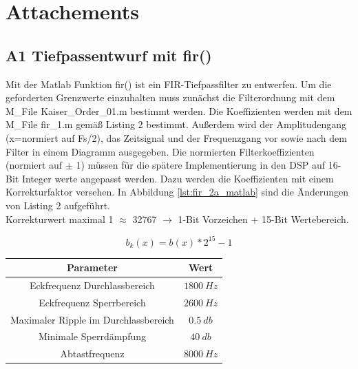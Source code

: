 \section{Attachements}

\subsection{A1 Tiefpassentwurf mit fir()}
Mit der Matlab Funktion fir() ist ein FIR-Tiefpassfilter zu entwerfen. Um die geforderten Grenzwerte einzuhalten muss zunächst die Filterordnung mit dem M\_File Kaiser\_Order\_01.m bestimmt werden. Die Koeffizienten werden mit dem M\_File fir\_1.m gemäß Listing 2 bestimmt. Außerdem wird der Amplitudengang (x=normiert auf Fs/2), das Zeitsignal und der Frequenzgang vor sowie nach dem Filter in einem Diagramm ausgegeben. Die normierten Filterkoeffizienten (normiert auf $\pm$ 1) müssen für die spätere Implementierung in den DSP auf 16-Bit Integer werte angepasst werden. Dazu werden die Koeffizienten mit einem Korrekturfaktor versehen. In Abbildung \ref{lst:fir_2a_matlab} sind die Änderungen von Listing 2 aufgeführt.\\Korrekturwert maximal 1 $\approx$ 32767 $\rightarrow$ 1-Bit Vorzeichen + 15-Bit Wertebereich.

\begin{equation}
b_{k}(x) = b(x) * 2^{15}-1
\end{equation}

\begin{table}[h]
	\centering
	\begin{tabular}{c | c}
		Parameter	& Wert	\\
		\hline
		Eckfrequenz Durchlassbereich			& $1800~Hz$	\\
		Eckfrequenz Sperrbereich				& $2600~Hz$	\\
		Maximaler Ripple im Durchlassbereich	& $0.5~db$	\\
		Minimale Sperrdämpfung					& $40~db$	\\
		Abtastfrequenz							& $8000~Hz$	\\
	\end{tabular}
\end{table}



\newpage



